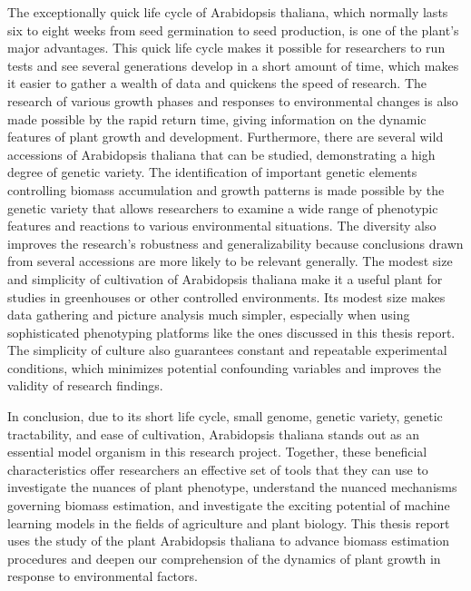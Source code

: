 \documentclass[a4paper,11pt]{report}%
\renewcommand{\\}{\vspace*{0.5\baselineskip} \newline}
\begin{document}
\noindent The exceptionally quick life cycle of Arabidopsis thaliana, which normally lasts six to eight weeks from seed germination to seed production, is one of the plant's major advantages. This quick life cycle makes it possible for researchers to run tests and see several generations develop in a short amount of time, which makes it easier to gather a wealth of data and quickens the speed of research. The research of various growth phases and responses to environmental changes is also made possible by the rapid return time, giving information on the dynamic features of plant growth and development.
Furthermore, there are several wild accessions of Arabidopsis thaliana that can be studied, demonstrating a high degree of genetic variety. The identification of important genetic elements controlling biomass accumulation and growth patterns is made possible by the genetic variety that allows researchers to examine a wide range of phenotypic features and reactions to various environmental situations. The diversity also improves the research's robustness and generalizability because conclusions drawn from several accessions are more likely to be relevant generally.
The modest size and simplicity of cultivation of Arabidopsis thaliana make it a useful plant for studies in greenhouses or other controlled environments. Its modest size makes data gathering and picture analysis much simpler, especially when using sophisticated phenotyping platforms like the ones discussed in this thesis report. The simplicity of culture also guarantees constant and repeatable experimental conditions, which minimizes potential confounding variables and improves the validity of research findings.

\noindent In conclusion, due to its short life cycle, small genome, genetic variety, genetic tractability, and ease of cultivation, Arabidopsis thaliana stands out as an essential model organism in this research project. Together, these beneficial characteristics offer researchers an effective set of tools that they can use to investigate the nuances of plant phenotype, understand the nuanced mechanisms governing biomass estimation, and investigate the exciting potential of machine learning models in the fields of agriculture and plant biology. This thesis report uses the study of the plant Arabidopsis thaliana to advance biomass estimation procedures and deepen our comprehension of the dynamics of plant growth in response to environmental factors.
\end{document}
